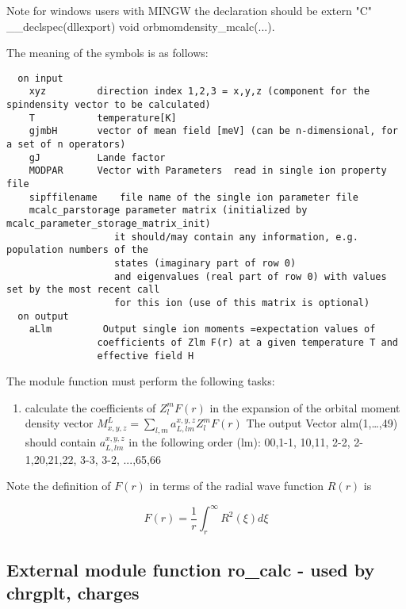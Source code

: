 Note for windows users with MINGW the declaration should be {\prg extern "C" \_\_declspec(dllexport) void %
orbmomdensity\_mcalc(...)}.

The meaning of the symbols is as follows:
{\footnotesize
\begin{verbatim}
  on input
    xyz         direction index 1,2,3 = x,y,z (component for the spindensity vector to be calculated)
    T           temperature[K]
    gjmbH       vector of mean field [meV] (can be n-dimensional, for a set of n operators)
    gJ          Lande factor
    MODPAR      Vector with Parameters  read in single ion property file
    sipffilename    file name of the single ion parameter file
    mcalc_parstorage parameter matrix (initialized by mcalc_parameter_storage_matrix_init)
                   it should/may contain any information, e.g. population numbers of the
				   states (imaginary part of row 0)
                   and eigenvalues (real part of row 0) with values set by the most recent call
                   for this ion (use of this matrix is optional)
  on output
    aLlm         Output single ion moments =expectation values of
                coefficients of Zlm F(r) at a given temperature T and
                effective field H
\end{verbatim}
}

The module function must perform the following tasks:
\begin{enumerate}
\item calculate the coefficients of $Z_l^m F(r)$ in the expansion of
      the orbital moment
      density vector $M^L_{x,y,z}=\sum_{l,m} a^{x,y,z}_{L,lm} Z_l^m F(r)$
      The output Vector alm(1,\dots,49) should contain  $a^{x,y,z}_{L,lm}$
      in the following order (lm):  00,1-1, 10,11, 2-2, 2-1,20,21,22, 3-3, 3-2, ...,65,66
\end{enumerate}

Note the definition of $F(r)$ in terms of the radial wave function $R(r)$ is

\begin{equation}
F(r)=\frac{1}{r}\int_r^{\infty} R^2(\xi)d\xi
\end{equation}

\subsection{External module function {\prg ro\_calc} -
used by {\prg chrgplt},
{\prg charges}
}

